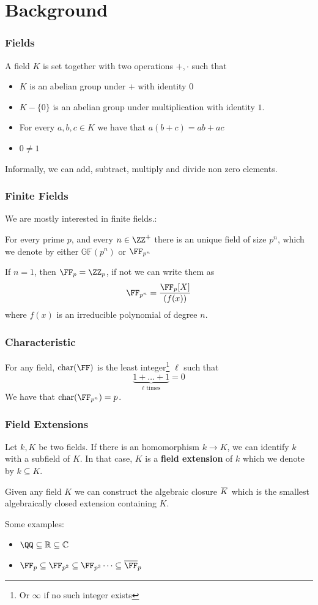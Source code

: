 \documentclass{beamer}
\newcommand{\overbar}[1]{\mkern 1.5mu\overline{\mkern-1.5mu#1\mkern-1.5mu}\mkern 1.5mu}
\begin{document}
\section{Background}
\begin{frame}
    \frametitle{Fields}
    \begin{definition}
        A field $K$ is set together with two operations $+, \cdot$ such that 
        \begin{itemize}
            \item $K$ is an abelian group under $+$ with identity $0$
            \item $K - \{ 0 \}$ is an abelian group under multiplication with identity $1$.
            \item For every $a,b,c \in K$ we have that $a (b + c) = ab + ac$
            \item $0 \neq 1$
        \end{itemize}
    \end{definition}
    
    Informally, we can add, subtract, multiply and divide non zero elements.
\end{frame}

\begin{frame}
    \frametitle{Finite Fields}
    We are mostly interested in finite fields.:
    \begin{theorem}
        For every prime $p$, and every $n \in \ZZ^+$ there is an unique field of size $p^n$, which we denote 
        by either $\mathbb{GF}(p^n)$ or $\FF_{p^n}$
    \end{theorem}
    
    
    If $n = 1$, then $\FF_{p} = \ZZ_p$, if not we can write them as
    \[ \FF_{p^n} = \frac{\FF_{p}[X]}{(f(x))} \]
    where $f(x)$ is an irreducible polynomial of degree $n$.
\end{frame}

\begin{frame}
    \frametitle{Characteristic}
    For any field, $\mathrm{char}(\FF)$ is the least integer\footnote{Or $\infty$ if no such integer exists} $\ell$ such that 
    \[ \underbrace{1 + \dots + 1}_{\ell \text{ times}} = 0 \]
    We have that $\mathrm{char}(\FF_{p^n}) = p$. 
\end{frame}

\begin{frame}
    \frametitle{Field Extensions}
    Let $k, K$ be two fields. If there is an homomorphism $k \to K$, we can identify $k$ with a subfield of $K$. 
    In that case, $K$ is a \textbf{field extension} of $k$ which we denote by $k \subseteq K$. 
    
    
    Given any field $K$ we can construct the algebraic closure $\overbar{K}$ which is the smallest algebraically closed extension containing $K$.

    Some examples:
    \begin{itemize}
        \item $\QQ \subseteq \mathbb{R} \subseteq \mathbb{C}$
        \item $\FF_p \subseteq \FF_{p^2} \subseteq \FF_{p^3} \dots \subseteq \overline{\FF}_{p}$
    \end{itemize}
\end{frame}
\end{document}
